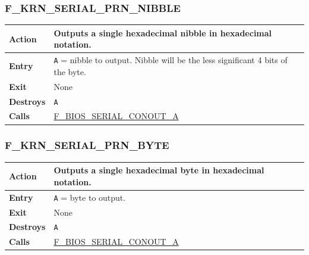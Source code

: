 \documentclass[a4paper,11pt]{article}
\begin{document}
        \subsubsection{F\_KRN\_SERIAL\_PRN\_NIBBLE}
        \label{func:fkrnserialprnnibble}
        \begin{tabular}{l p{9cm}}
            \hline\textbf{Action}
            & Outputs a single hexadecimal nibble in hexadecimal notation.\\
            \hline\textbf{Entry}
            & \texttt{A} = nibble to output. Nibble will be the less significant 
            4 bits of the byte.\\
            \hline\textbf{Exit} & None \\
            \hline\textbf{Destroys} & \texttt{A} \\
            \hline\textbf{Calls}
            & \hyperref[func:fbiosserialconouta]{F\_BIOS\_SERIAL\_CONOUT\_A}\\
            \hline
        \end{tabular}

        \subsubsection{F\_KRN\_SERIAL\_PRN\_BYTE}
        \label{func:fkrnserialprnbyte}
        \begin{tabular}{l p{9cm}}
            \hline\textbf{Action}
            & Outputs a single hexadecimal byte in hexadecimal notation.\\
            \hline\textbf{Entry}
            & \texttt{A} = byte to output.\\
            \hline\textbf{Exit} & None \\
            \hline\textbf{Destroys} & \texttt{A} \\
            \hline\textbf{Calls}
            & \hyperref[func:fbiosserialconouta]{F\_BIOS\_SERIAL\_CONOUT\_A}\\
            \hline
        \end{tabular}

\end{document}
